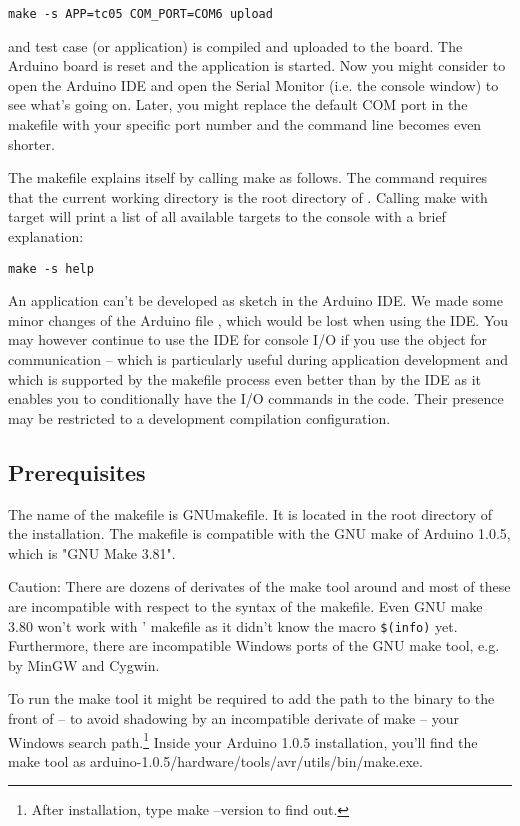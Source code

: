 \verb+make -s APP=tc05 COM_PORT=COM6 upload+

and test case (or application)  is compiled and uploaded
to the board. The Arduino board is reset and the \rtos{} application is
started. Now you might consider to open the Arduino IDE and open the
Serial Monitor (i.e. the console window) to see what's going on. Later,
you might replace the default COM port in the makefile with your specific
port number and the command line becomes even shorter.

The makefile explains itself by calling make as follows. The command
requires that the current working directory is the root directory of
\rtos{}. Calling make with target  will print a list of all
available targets to the console with a brief explanation:

\verb+make -s help+

An \rtos{} application can't be developed as sketch in the Arduino IDE. We
made some minor changes of the Arduino file , which would be
lost when using the IDE. You may however continue to use the IDE for
console I/O if you use the object  for communication --
which is particularly useful during application development and which is
supported by the makefile process even better than by the IDE as it
enables you to conditionally have the I/O commands in the code. Their
presence may be restricted to a development compilation configuration.


\subsection{Prerequisites}
\label{secPrerequisites}

The name of the makefile is GNUmakefile. It is located in the root
directory of the \rtos{} installation. The makefile is compatible with the
GNU make of Arduino 1.0.5, which is "GNU Make 3.81".

Caution: There are dozens of derivates of the make tool around and most of
these are incompatible with respect to the syntax of the makefile. Even
GNU make 3.80 won't work with \rtos' makefile as it didn't know the macro
\verb+$(info)+ yet. Furthermore, there are incompatible Windows ports of
the GNU make tool, e.g. by MinGW and Cygwin.

To run the make tool it might be required to add the path to the binary to
the front of -- to avoid shadowing by an incompatible derivate of make --
your Windows search path.\footnote{After installation, type make --version
to find out.} Inside your Arduino 1.0.5 installation, you'll find the make
tool as
arduino-1.0.5/\-hard\-ware/\-tools/\-avr/\-utils/\-bin/\-make.exe.

